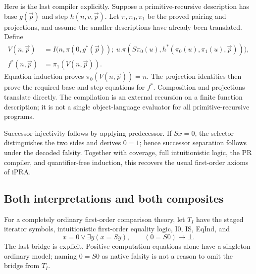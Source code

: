 Here is the last compiler explicitly. Suppose a primitive-recursive
description has base $g(\vec p)$ and step $h(n,v,\vec p)$.
Let $\pi,\pi_0,\pi_1$ be the proved pairing and projections, and
assume the smaller descriptions have already been translated. Define
\begin{align*}
 V(n,\vec p)&=I\bigl(n,\pi(0,g^*(\vec p));\ u.
       \pi(S\pi_0(u),h^*(\pi_0(u),\pi_1(u),\vec p))\bigr),\\
 f^*(n,\vec p)&=\pi_1(V(n,\vec p)).
\end{align*}
Equation induction proves $\pi_0(V(n,\vec p))=n$. The projection
identities then prove the required base and step equations for $f^*$.
Composition and projections translate directly. The compilation is an
external recursion on a finite function description; it is not a single
object-language evaluator for all primitive-recursive programs.

Successor injectivity follows by applying predecessor. If $Sx=0$,
the selector distinguishes the two sides and derives $0=1$; hence
successor separation follows under the decoded falsity. Together with
coverage, full intuitionistic logic, the PR compiler, and quantifier-free
induction, this recovers the usual first-order axioms of iPRA.

\subsection{Both interpretations and both composites}

For a completely ordinary first-order comparison theory, let $T_I$
have the staged iterator symbols, intuitionistic first-order equality
logic, I0, IS, EqInd, and
\[
 x=0\vee\exists y(x=Sy),\qquad (0=S0)\to\bot.
\]
The last bridge is explicit. Positive computation equations alone have
a singleton ordinary model; naming $0=S0$ as native falsity is not a
reason to omit the bridge from $T_I$.

